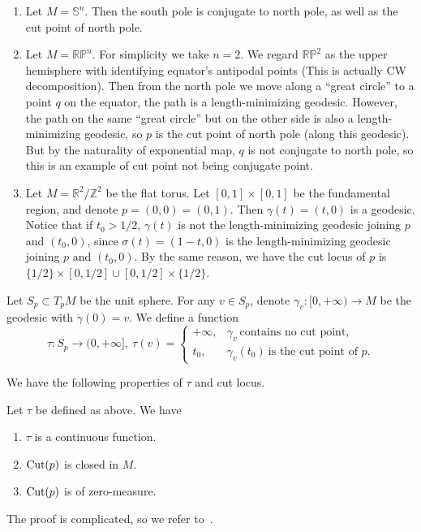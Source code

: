 \begin{eg}\label{eg of cut pts}
    \begin{enumerate}[(1)]
        \item Let $M=\mathbb{S}^n$.
        Then the south pole is conjugate to north pole, as well as the cut point of north pole.
        \item Let $M=\mathbb{RP}^n$.
        For simplicity we take $n=2$.
        We regard $\mathbb{RP}^2$ as the upper hemisphere with identifying equator's antipodal points (This is actually CW decomposition).
        Then from the north pole we move along a ``great circle'' to a point $q$ on the equator, the path is a length-minimizing geodesic.
        However, the path on the same ``great circle'' but on the other side is also a length-minimizing geodesic, so $p$ is the cut point of north pole (along this geodesic).
        But by the naturality of exponential map, $q$ is not conjugate to north pole, so this is an example of cut point not being conjugate point.
        \item Let $M=\mathbb{R}^2/\mathbb{Z}^2$ be the flat torus.
        Let $[0,1]\times[0,1]$ be the fundamental region, and denote $p=(0,0)=(0,1)$.
        Then $\gamma(t)=(t,0)$ is a geodesic.
        Notice that if $t_0>1/2$, $\gamma(t)$ is not the length-minimizing geodesic joining $p$ and $(t_0,0)$, since $\sigma(t)=(1-t,0)$ is the length-minimizing geodesic joining $p$ and $(t_0,0)$.
        By the same reason, we have the cut locus of $p$ is $\{1/2\}\times[0,1/2]\cup[0,1/2]\times\{1/2\}$.
    \end{enumerate}
\end{eg}

Let $S_p\subset T_pM$ be the unit sphere.
For any $v\in S_p$, denote $\gamma_v:[0,+\infty)\to M$ be the geodesic with $\dot{\gamma}(0)=v$.
We define a function
\[\tau:S_p\to(0,+\infty],\ \tau(v)=\begin{cases}
    +\infty, & \gamma_v\ \text{contains no cut point},\\
    t_0, & \gamma_v(t_0)\ \text{is the cut point of }p.
\end{cases}\]

We have the following properties of $\tau$ and cut locus.
\begin{prop}
    Let $\tau$ be defined as above. We have
    \begin{enumerate}[(1)]
        \item $\tau$ is a continuous function.
        \item $\operatorname{Cut}(p)$ is closed in $M$.
        \item $\operatorname{Cut}(p)$ is of zero-measure.
    \end{enumerate}
\end{prop}
The proof is complicated, so we refer to~\cite[Chapter~10]{Wu}.

